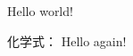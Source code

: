 \documentclass{assignment}
\begin{document}
    Hello world!

    化学式：
    \clearpage
    Hello again!
\end{document}
